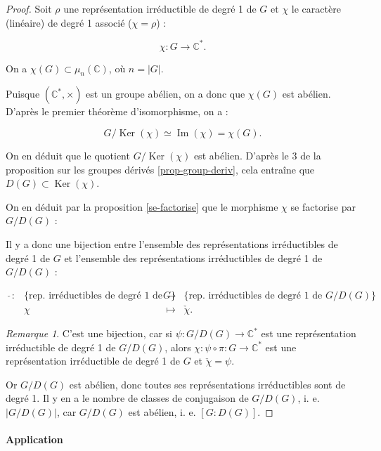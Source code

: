 \documentclass[french]{book}
\theoremstyle{definition}
\theoremstyle{remark}
\newtheorem*{remark}{Remarque}
\begin{document}
\begin{proof}
  Soit \(\rho\) une représentation irréductible de degré 1 de \(G\) et \(\chi\) le caractère (linéaire) de degré 1 associé (\(\chi = \rho\)) :

  \[\chi : G \longrightarrow \mathbb{C} ^{*}.\]

  On a \(\chi(G) \subset \mu_n(\mathbb{C})\), où \(n=\left\lvert G \right\rvert\).

  Puisque \((\mathbb{C}^{*}, \times)\) est un groupe abélien, on a donc que \(\chi(G)\) est abélien. D'après le premier théorème d'isomorphisme, on a :

  \[G/ \operatorname{Ker}(\chi) \simeq \operatorname{Im}(\chi) = \chi(G).\]

  On en déduit que le quotient \(G/\operatorname{Ker}(\chi)\) est abélien. D'après le 3 de la proposition sur les groupes dérivés \ref{prop-group-deriv}, cela entraîne que \(D(G) \subset \operatorname{Ker}(\chi)\).

  On en déduit par la proposition \ref{se-factorise} que le morphisme \(\chi\) se factorise par \(G/D(G)\) :

  Il y a donc une bijection entre l'ensemble des représentations irréductibles de degré 1 de \(G\) et l'ensemble des représentations irréductibles de degré 1 de \(G/D(G)\) :

  \[\begin{matrix}
  \check{ \ } : & \{ \text{rep. irréductibles de degré 1 de } G \}& \longrightarrow & \{ \text{rep. irréductibles de degré 1 de } G/D(G) \}\\
  \ & \chi & \longmapsto & \check{\chi}.
  \end{matrix}\]

  \begin{remark}
    C'est une bijection, car si \(\psi : G/D(G) \longrightarrow \mathbb{C} ^{*}\) est une représentation irréductible de degré 1 de \(G/D(G)\), alors \(\chi : \psi \circ \pi : G \longrightarrow \mathbb{C}^{*}\) est une représentation irréductible de degré 1 de \(G\) et \(\check{\chi} = \psi\).
  \end{remark}

  Or \(G/D(G)\) est abélien, donc toutes ses représentations irréductibles sont de degré 1. Il y en a le nombre de classes de conjugaison de \(G/D(G)\), i. e. \(\left\lvert G/D(G) \right\rvert\), car \(G/D(G)\) est abélien, i. e. \([G : D(G)]\).
\end{proof}

\paragraph{Application}
\end{document}
